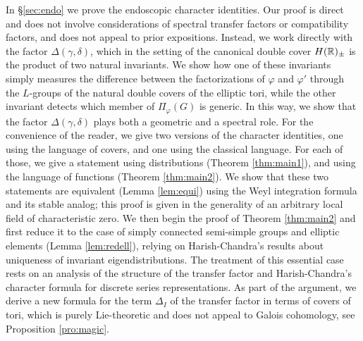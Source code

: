 \documentclass{article}
\theoremstyle{definition}
\numberwithin{equation}{section}
\renewcommand{\-}{\hyp{}}
\begin{document}
In \S\ref{sec:endo} we prove the endoscopic character identities. Our proof is direct and does not involve considerations of spectral transfer factors or compatibility factors, and does not appeal to prior expositions. Instead, we work directly with the factor $\Delta(\gamma,\delta)$, which in the setting of the canonical double cover $H(\mathbb{R})_\pm$ is the product of two natural invariants. We show how one of these invariants simply measures the difference between the factorizations of $\varphi$ and $\varphi'$ through the $L$\-groups of the natural double covers of the elliptic tori, while the other invariant detects which member of $\Pi_\varphi(G)$ is generic. In this way, we show that the factor $\Delta(\gamma,\delta)$ plays both a geometric and a spectral role. For the convenience of the reader, we give two versions of the character identities, one using the language of covers, and one using the classical language. For each of those, we give a statement using distributions (Theorem \ref{thm:main1}), and using the language of functions (Theorem \ref{thm:main2}). We show that these two statements are equivalent (Lemma \ref{lem:equi}) using the Weyl integration formula and its stable analog; this proof is given in the generality of an arbitrary local field of characteristic zero. We then begin the proof of Theorem \ref{thm:main2} and first reduce it to the case of simply connected semi-simple groups and elliptic elements (Lemma \ref{lem:redell}), relying on Harish-Chandra's results about uniqueness of invariant eigendistributions. The treatment of this essential case rests on an analysis of the structure of the transfer factor and Harish-Chandra's character formula for discrete series representations. As part of the argument, we derive a new formula for the term $\Delta_I$ of the transfer factor in terms of covers of tori, which is purely Lie-theoretic and does not appeal to Galois cohomology, see Proposition \ref{pro:magic}.
\end{document}
